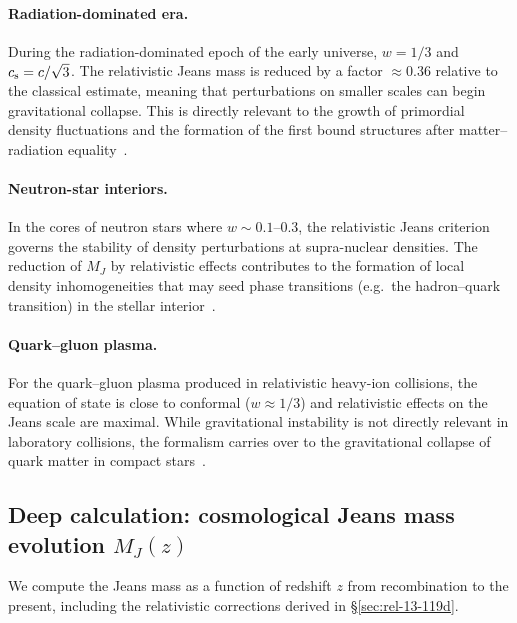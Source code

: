 \paragraph{Radiation-dominated era.}
During the radiation-dominated epoch of the early universe,
$w = 1/3$ and $c_{\mathrm{s}} = c/\sqrt{3}$.  The relativistic Jeans mass
is reduced by a factor $\approx 0.36$ relative to the classical
estimate, meaning that perturbations on smaller scales can begin
gravitational collapse.  This is directly relevant to the growth
of primordial density fluctuations and the formation of the
first bound structures after matter--radiation
equality~\citep{Weinberg1972,Lifshitz1946}.

\paragraph{Neutron-star interiors.}
In the cores of neutron stars where $w \sim 0.1$--$0.3$, the
relativistic Jeans criterion governs the stability of density
perturbations at supra-nuclear densities.  The reduction of
$M_{J}$ by relativistic effects contributes to the formation
of local density inhomogeneities that may seed phase
transitions (e.g.\ the hadron--quark transition) in the stellar
interior~\citep{RezzollaZanotti2013}.

\paragraph{Quark--gluon plasma.}
For the quark--gluon plasma produced in relativistic heavy-ion
collisions, the equation of state is close to conformal
($w \approx 1/3$) and relativistic effects on the Jeans scale are
maximal.  While gravitational instability is not directly relevant
in laboratory collisions, the formalism carries over to the
gravitational collapse of quark matter in compact
stars~\citep{ShapiroTeukolsky1983}.

\subsection{Deep calculation: cosmological Jeans mass evolution $M_{J}(z)$}
\label{sec:rel-13-119-deep-cosmic}

We compute the Jeans mass as a function of redshift $z$ from
recombination to the present, including the relativistic corrections
derived in \S\ref{sec:rel-13-119d}.

